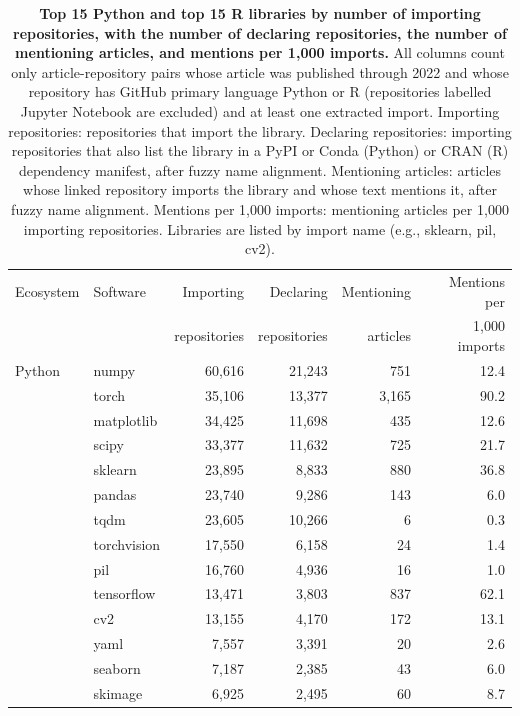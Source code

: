\documentclass[pdflatex,sn-nature]{sn-jnl}%
\begin{document}
\begin{table}[ht]
\caption{\textbf{Top 15 Python and top 15 R libraries by number of importing repositories, with the number of declaring repositories, the number of mentioning articles, and mentions per 1,000 imports.} All columns count only article-repository pairs whose article was published through 2022 and whose repository has GitHub primary language Python or R (repositories labelled Jupyter Notebook are excluded) and at least one extracted import. Importing repositories: repositories that import the library. Declaring repositories: importing repositories that also list the library in a PyPI or Conda (Python) or CRAN (R) dependency manifest, after fuzzy name alignment. Mentioning articles: articles whose linked repository imports the library and whose text mentions it, after fuzzy name alignment. Mentions per 1,000 imports: mentioning articles per 1,000 importing repositories. Libraries are listed by import name (e.g., sklearn, pil, cv2).}\label{tab:topsoftware}
\begin{tabular}{@{}llrrrr@{}}
\toprule
Ecosystem & Software & Importing & Declaring & Mentioning & Mentions per \\
 & & repositories & repositories & articles & 1,000 imports \\
\midrule
Python & numpy & 60,616 & 21,243 & 751 & 12.4 \\
 & torch & 35,106 & 13,377 & 3,165 & 90.2 \\
 & matplotlib & 34,425 & 11,698 & 435 & 12.6 \\
 & scipy & 33,377 & 11,632 & 725 & 21.7 \\
 & sklearn & 23,895 & 8,833 & 880 & 36.8 \\
 & pandas & 23,740 & 9,286 & 143 & 6.0 \\
 & tqdm & 23,605 & 10,266 & 6 & 0.3 \\
 & torchvision & 17,550 & 6,158 & 24 & 1.4 \\
 & pil & 16,760 & 4,936 & 16 & 1.0 \\
 & tensorflow & 13,471 & 3,803 & 837 & 62.1 \\
 & cv2 & 13,155 & 4,170 & 172 & 13.1 \\
 & yaml & 7,557 & 3,391 & 20 & 2.6 \\
 & seaborn & 7,187 & 2,385 & 43 & 6.0 \\
 & skimage & 6,925 & 2,495 & 60 & 8.7 \\

\end{tabular}
\end{table}
\end{document}
